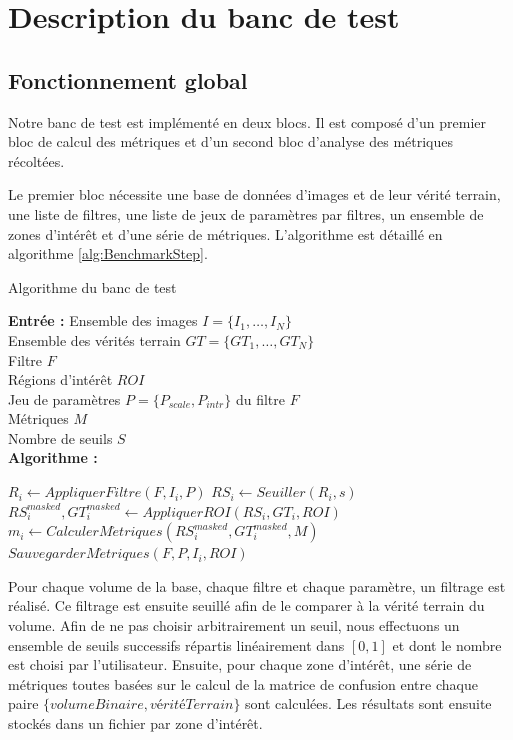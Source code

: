 \section{Description du banc de test}
\subsection{Fonctionnement global}
Notre banc de test est implémenté en deux blocs. Il est composé d'un premier bloc de calcul des métriques et d'un second bloc d'analyse des métriques récoltées.

Le premier bloc nécessite une base de données d'images et de leur vérité terrain, une liste de filtres, une liste de jeux de paramètres par filtres, un ensemble de zones d'intérêt et d'une série de métriques. L'algorithme est détaillé en algorithme \ref{alg:BenchmarkStep}.

\begin{algorithm}[!ht]
  \caption{Algorithme du banc de test}\label{alg:BenchmarkStep}
      \textbf{Entrée :}
      Ensemble des images $I=\{I_1,\ldots,I_N\}$ \\
      Ensemble des vérités terrain $GT=\{GT_1,\ldots,GT_N\}$\\
      Filtre $F$\\
      Régions d'intérêt $ROI$\\
      Jeu de paramètres  $P=\{ P_{scale},P_{intr} \} $ du filtre $F$\\ 
      Métriques $M$\\
      Nombre de seuils $S$ \\
      \textbf{Algorithme :}
      \begin{algorithmic}
              \State $R_{i} \gets AppliquerFiltre(F,I_i,P)$
                \State $RS_{i} \gets Seuiller(R_{i},s)$
                \State $RS_{i}^{masked},GT_{i}^{masked} \gets AppliquerROI( RS_{i},GT_{i}, ROI ) $
                \State $m_{i} \gets CalculerM\acute{e}triques(RS_{i}^{masked}, GT_{i}^{masked}, M)$
                \State $SauvegarderM\acute{e}triques(F,P,I_i,ROI)$
              \EndFor
          \EndFor
      \end{algorithmic}
  \end{algorithm}

Pour chaque volume de la base, chaque filtre et chaque paramètre, un filtrage est réalisé. Ce filtrage est ensuite seuillé afin de le comparer à la vérité terrain du volume. Afin de ne pas choisir arbitrairement un seuil, nous effectuons un ensemble de seuils successifs répartis linéairement dans $[0,1]$ et dont le nombre est choisi par l'utilisateur. Ensuite, pour chaque zone d'intérêt, une série de métriques toutes basées sur le calcul de la matrice de confusion entre chaque paire $\{volume Binaire, vérité Terrain\}$ sont calculées. Les résultats sont ensuite stockés dans un fichier par zone d'intérêt.

